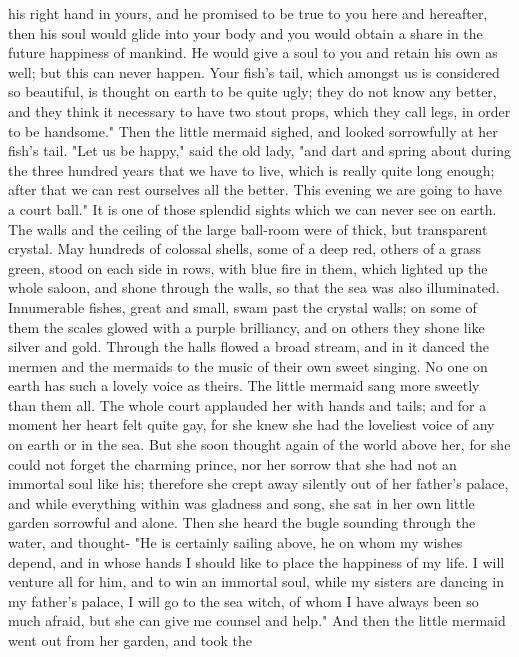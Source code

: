 his right hand in yours, and he promised to be true to you here and
hereafter, then his soul would glide into your body and you would
obtain a share in the future happiness of mankind. He would give a
soul to you and retain his own as well; but this can never happen.
Your fish's tail, which amongst us is considered so beautiful, is
thought on earth to be quite ugly; they do not know any better, and
they think it necessary to have two stout props, which they call legs,
in order to be handsome."
    Then the little mermaid sighed, and looked sorrowfully at her
fish's tail. "Let us be happy," said the old lady, "and dart and
spring about during the three hundred years that we have to live,
which is really quite long enough; after that we can rest ourselves
all the better. This evening we are going to have a court ball."
    It is one of those splendid sights which we can never see on
earth. The walls and the ceiling of the large ball-room were of thick,
but transparent crystal. May hundreds of colossal shells, some of a
deep red, others of a grass green, stood on each side in rows, with
blue fire in them, which lighted up the whole saloon, and shone
through the walls, so that the sea was also illuminated. Innumerable
fishes, great and small, swam past the crystal walls; on some of
them the scales glowed with a purple brilliancy, and on others they
shone like silver and gold. Through the halls flowed a broad stream,
and in it danced the mermen and the mermaids to the music of their own
sweet singing. No one on earth has such a lovely voice as theirs.
The little mermaid sang more sweetly than them all. The whole court
applauded her with hands and tails; and for a moment her heart felt
quite gay, for she knew she had the loveliest voice of any on earth or
in the sea. But she soon thought again of the world above her, for she
could not forget the charming prince, nor her sorrow that she had
not an immortal soul like his; therefore she crept away silently out
of her father's palace, and while everything within was gladness and
song, she sat in her own little garden sorrowful and alone. Then she
heard the bugle sounding through the water, and thought- "He is
certainly sailing above, he on whom my wishes depend, and in whose
hands I should like to place the happiness of my life. I will
venture all for him, and to win an immortal soul, while my sisters are
dancing in my father's palace, I will go to the sea witch, of whom I
have always been so much afraid, but she can give me counsel and
help."
    And then the little mermaid went out from her garden, and took the
